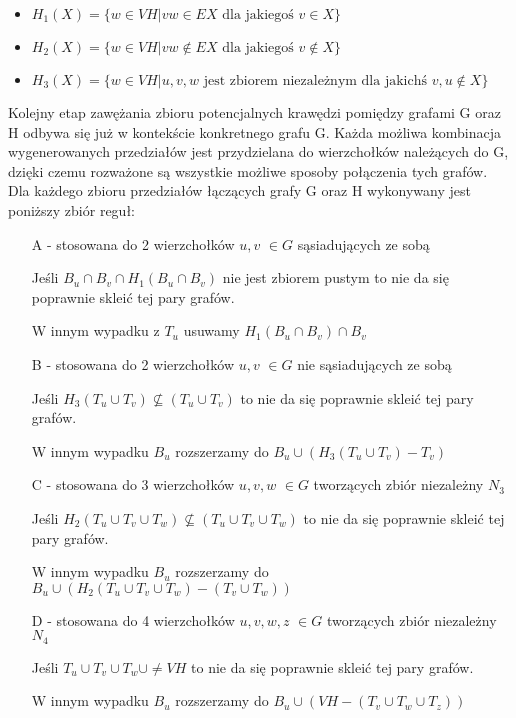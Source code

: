 \documentclass[11pt]{article}
\begin{document}
\begin{itemize}
    
  \item   $H_1(X) = \{ w \in VH | vw \in EX \textrm{ dla jakiegoś } v \in X \}$ 
  
  \item   $H_2(X) = \{ w \in VH | vw \notin EX \textrm{ dla jakiegoś } v \notin X\}$
  
  \item   $H_3(X) = \{ w \in VH | { u, v, w } \textrm{ jest zbiorem niezależnym dla jakichś } v, u \notin X\}$ 
\end{itemize}
Kolejny etap zawężania zbioru potencjalnych krawędzi pomiędzy grafami G oraz H odbywa się już w kontekście konkretnego grafu G. Każda możliwa kombinacja wygenerowanych przedziałów jest  przydzielana do wierzchołków należących do G, dzięki czemu rozważone są wszystkie możliwe sposoby połączenia tych grafów. Dla każdego zbioru przedziałów łączących grafy G oraz H wykonywany jest poniższy zbiór reguł:
\begin{itemize}
  \item[A] - stosowana do 2 wierzchołków $u,v$ $\in G$ sąsiadujących ze sobą 
  
  Jeśli $B_u \cap B_v \cap H_1(B_u \cap B_v)$ nie jest zbiorem pustym to nie da się 
  poprawnie skleić tej pary grafów. 
  
  W innym wypadku z $T_u$ usuwamy $H_1(B_u \cap B_v) \cap B_v $  
  \item[B] - stosowana do 2 wierzchołków $u,v$ $\in G$ nie sąsiadujących ze sobą 
  
  Jeśli $H_3(T_u \cup T_v) \not\subseteq (T_u \cup T_v)$ to nie da się poprawnie skleić tej 
  pary grafów. 
  
  W innym wypadku $B_u$ rozszerzamy do $B_u \cup (H_3(T_u \cup T_v) - T_v)$
  \item[C] - stosowana do 3 wierzchołków $u,v,w$ $\in G$ tworzących zbiór niezależny $N_3$ 
  
  Jeśli $H_2(T_u \cup T_v \cup T_w) \not\subseteq (T_u \cup T_v \cup T_w)$ 
  to nie da się poprawnie skleić tej pary grafów. 
  
  W innym wypadku $B_u$ rozszerzamy do $B_u \cup (H_2(T_u \cup T_v \cup T_w) - (T_v \cup T_w))$
  \item[D] - stosowana do 4 wierzchołków $u,v,w,z$ $\in G$ tworzących zbiór niezależny $N_4$  
  
  Jeśli $T_u \cup T_v \cup T_w \cup \neq VH $ to nie da się poprawnie skleić tej pary grafów.
  
  W innym wypadku $B_u$ rozszerzamy do $B_u \cup (VH - (T_v \cup T_w \cup T_z))$
\end{itemize}
\end{document}
